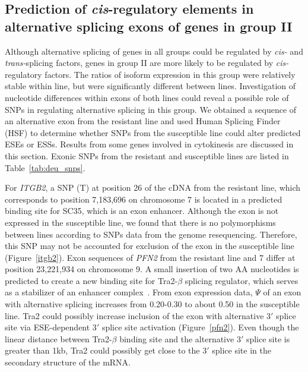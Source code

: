\documentclass[10pt]{article}
\begin{document}

\subsection*{Prediction of {\em cis}-regulatory elements in
alternative splicing exons of genes in group II}

Although alternative splicing of genes in all groups could be
regulated by {\em cis-} and {\em trans-}splicing factors, genes
in group II are more likely to be regulated by {\em
cis-}regulatory factors.  The ratios of isoform expression in
this group were relatively stable within line, but were
significantly different between lines.  Investigation of
nucleotide differences within exons of both lines could reveal a
possible role of SNPs in regulating alternative splicing in this
group.  We obtained a sequence of an alternative exon from the
resistant line and used Human Splicing Finder (HSF) to determine
whether SNPs from the susceptible line could alter predicted ESEs
or ESSs.  Results from some genes involved in cytokinesis are
discussed in this section.  Exonic SNPs from the resistant and
susceptible lines are listed in Table~\ref{tab:deu_snps}.

For {\em ITGB2}, a SNP (T) at position 26 of the cDNA from the
resistant line, which corresponds to position 7,183,696 on
chromosome 7 is located in a predicted binding site for SC35,
which is an exon enhancer.  Although the exon is not expressed in
the susceptible line, we found that there is no polymorphisms
between lines according to SNPs data from the genome
resequencing.  Therefore, this SNP may not be accounted for
exclusion of the exon in the susceptible line
(Figure~\ref{itgb2}).  Exon sequences of {\em PFN2} from the
resistant line and 7 differ at position 23,221,934 on chromosome
9.  A small insertion of two AA nucleotides is predicted to
create a new binding site for Tra2-$\beta$ splicing regulator,
which serves as a stabilizer of an enhancer
complex~\cite{lopez1998alternative}.  From exon expression data,
$\Psi$ of an exon with alternative splicing increases from
0.20-0.30 to about 0.50 in the susceptible line.  Tra2 could
possibly increase inclusion of the exon with alternative
3$\prime$ splice site via ESE-dependent 3$\prime$ splice site
activation (Figure~\ref{pfn2}).  Even though the linear distance
between Tra2-$\beta$ binding site and the alternative 3$\prime$
splice site is greater than 1kb, Tra2 could possibly get close to
the 3$\prime$ splice site in the secondary structure of the mRNA.
\end{document}
